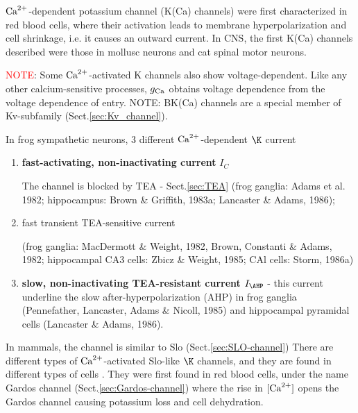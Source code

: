 ${\text{Ca}^{2+}}$-dependent potassium channel (K(Ca) channels) were first characterized in
red blood cells, where their activation leads to membrane hyperpolarization and
cell shrinkage, i.e. it causes an outward current. In CNS, the first K(Ca)
channels described were those in mollusc neurons and cat spinal motor neurons.

\textcolor{red}{NOTE}: Some ${\text{Ca}^{2+}}$-activated K channels also show
voltage-dependent. Like any other calcium-sensitive processes, $g_{\ce{Ca}}$
obtains voltage dependence from the voltage dependence of  entry.
NOTE: BK(Ca) channels are a special member of Kv-subfamily
(Sect.\ref{sec:Kv_channel}).

In frog sympathetic neurons, 3 different ${\text{Ca}^{2+}}$-dependent $\K$ current
\begin{enumerate}
  \item {\bf fast-activating, non-inactivating current} $I_C$ 
  
  The channel is blocked by TEA - Sect.\ref{sec:TEA}
  (frog ganglia: Adams et al. 1982; hippocampus: Brown \& Griffith, 1983a;
  Lancaster \& Adams, 1986);

  \item fast transient TEA-sensitive current
  
  (frog ganglia: MacDermott \& Weight, 1982, Brown, Constanti \&
  Adams, 1982; hippocampal CA3 cells: Zbicz \& Weight, 1985; CAl cells: Storm,
  1986a)

  \item {\bf slow, non-inactivating TEA-resistant current} $I_\AHP$ - this
  current underline the slow after-hyperpolarization (AHP) in frog ganglia 
  (Pennefather, Lancaster, Adams \& Nicoll, 1985) and hippocampal pyramidal cells
  (Lancaster \& Adams, 1986).
  
\end{enumerate}

In mammals, the channel is similar to Slo (Sect.\ref{sec:SLO-channel}) There are
different types of ${\text{Ca}^{2+}}$-activated Slo-like $\K$ channels, and they are found in
different types of cells \citep{blatz1987}. They were first found in red blood
cells, under the name Gardos channel (Sect.\ref{sec:Gardos-channel}) where the
rise in $[{\text{Ca}^{2+}}]$ opens the Gardos channel causing potassium loss and cell
dehydration.


